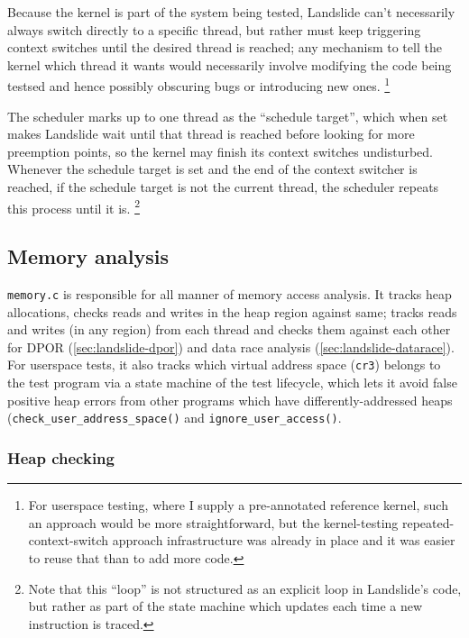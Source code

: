 Because the kernel is part of the system being tested, Landslide can't necessarily always switch directly to a specific thread,
but rather must keep triggering context switches until the desired thread is reached;
any mechanism to tell the kernel which thread it wants would necessarily involve modifying the code being testsed
and hence possibly obscuring bugs or introducing new ones.%
\footnote{For userspace testing, where I supply a pre-annotated reference kernel,
such an approach would be more straightforward,
but the kernel-testing repeated-context-switch approach infrastructure was already in place
and it was easier to reuse that than to add more code.}

The scheduler marks up to one thread as the ``schedule target'',
which when set makes Landslide wait until that thread is reached before looking for more preemption points,
so the kernel may finish its context switches undisturbed.
Whenever the schedule target is set and the end of the context switcher is reached,
if the schedule target is not the current thread,
the scheduler repeats this process until it is.%
\footnote{Note that this ``loop'' is not structured as an explicit loop in Landslide's code,
but rather as part of the state machine which updates each time a new instruction is traced.}


\subsection{Memory analysis}
\label{sec:landslide-memory}

{\tt memory.c} is responsible for all manner of memory access analysis.
It tracks heap allocations, checks reads and writes in the heap region against same;
tracks reads and writes (in any region) from each thread
and checks them against each other
for DPOR (\cref{sec:landslide-dpor})
and data race analysis (\cref{sec:landslide-datarace}).
For userspace tests, it also tracks which virtual address space ({\tt cr3}) belongs to the test program
via a state machine of the test lifecycle,
which lets it avoid false positive heap errors from other programs which have differently-addressed heaps
({\tt check\_user\_address\_space()} and {\tt ignore\_user\_access()}.

\subsubsection{Heap checking}
\label{sec:landslide-valgrind-mode}

